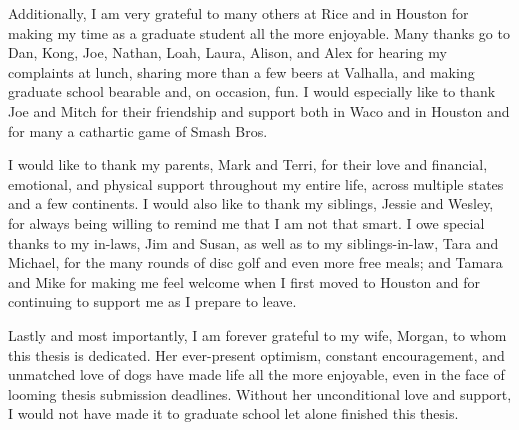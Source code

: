 \begin{acknowledgements}
Additionally, I am very grateful to many others at Rice and in Houston for making my time as a graduate student all the more enjoyable. Many thanks go to Dan, Kong, Joe, Nathan, Loah, Laura, Alison, and Alex for hearing my complaints at lunch, sharing more than a few beers at Valhalla, and making graduate school bearable and, on occasion, fun. I would especially like to thank Joe and Mitch for their friendship and support both in Waco and in Houston and for many a cathartic game of Smash Bros.

I would like to thank my parents, Mark and Terri, for their love and financial, emotional, and physical support throughout my entire life, across multiple states and a few continents. I would also like to thank my siblings, Jessie and Wesley, for always being willing to remind me that I am not that smart. I owe special thanks to my in-laws, Jim and Susan, as well as to my siblings-in-law, Tara and Michael, for the many rounds of disc golf and even more free meals; and Tamara and Mike for making me feel welcome when I first moved to Houston and for continuing to support me as I prepare to leave.

Lastly and most importantly, I am forever grateful to my wife, Morgan, to whom this thesis is dedicated. Her ever-present optimism, constant encouragement, and unmatched love of dogs have made life all the more enjoyable, even in the face of looming thesis submission deadlines. Without her unconditional love and support, I would not have made it to graduate school let alone finished this thesis.

\end{acknowledgements}
